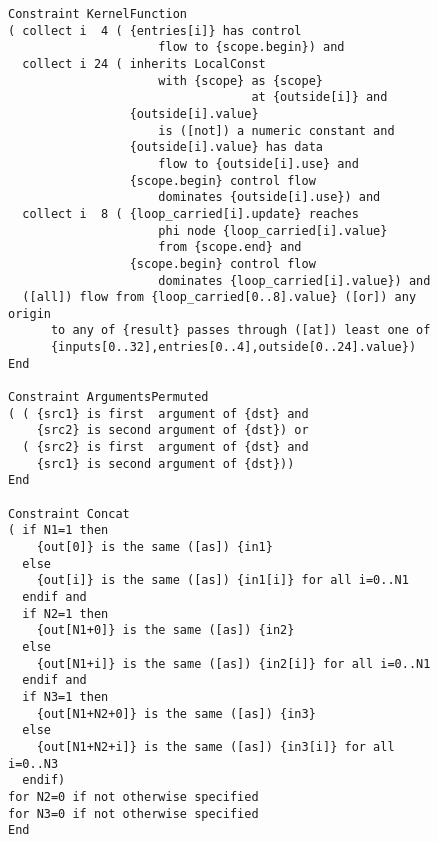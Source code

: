\begin{figure}[p]
\begin{lstlisting}[language=IDL,basicstyle=\linespread{0.8}\ttfamily,
                   firstnumber=189]
Constraint KernelFunction
( collect i  4 ( {entries[i]} has control
                     flow to {scope.begin}) and
  collect i 24 ( inherits LocalConst
                     with {scope} as {scope}
                                  at {outside[i]} and
                 {outside[i].value}
                     is ([not]) a numeric constant and
                 {outside[i].value} has data
                     flow to {outside[i].use} and
                 {scope.begin} control flow
                     dominates {outside[i].use}) and
  collect i  8 ( {loop_carried[i].update} reaches
                     phi node {loop_carried[i].value}
                     from {scope.end} and
                 {scope.begin} control flow
                     dominates {loop_carried[i].value}) and
  ([all]) flow from {loop_carried[0..8].value} ([or]) any origin
      to any of {result} passes through ([at]) least one of
      {inputs[0..32],entries[0..4],outside[0..24].value})
End

Constraint ArgumentsPermuted
( ( {src1} is first  argument of {dst} and
    {src2} is second argument of {dst}) or
  ( {src2} is first  argument of {dst} and
    {src1} is second argument of {dst}))
End

Constraint Concat
( if N1=1 then
    {out[0]} is the same ([as]) {in1}
  else
    {out[i]} is the same ([as]) {in1[i]} for all i=0..N1
  endif and
  if N2=1 then
    {out[N1+0]} is the same ([as]) {in2}
  else
    {out[N1+i]} is the same ([as]) {in2[i]} for all i=0..N1
  endif and
  if N3=1 then
    {out[N1+N2+0]} is the same ([as]) {in3}
  else
    {out[N1+N2+i]} is the same ([as]) {in3[i]} for all i=0..N3
  endif)
for N2=0 if not otherwise specified
for N3=0 if not otherwise specified
End
\end{lstlisting}
\end{figure}